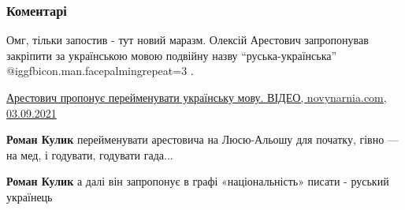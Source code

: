  
 
 
 
 
\subsubsection{Коментарі}
\label{sec:03_09_2021.fb.kulyk_roman.1.ukraina_rusj_bezumstvo.cmt}

\begin{itemize}

Омг, тільки запостив - тут новий маразм. Олексій Арестович запропонував
закріпити за українською мовою подвійну назву
\enquote{руська-українська} @igg{fbicon.man.facepalming}{repeat=3} .

\href{https://novynarnia.com/2021/09/03/arestovych-proponuye-perejmenuvaty-ukrayinsku-movu}{%
Арестович пропонує перейменувати українську мову. ВІДЕО, novynarnia.com, 03.09.2021%
}

\begin{itemize}
 
\textbf{Роман Кулик} перейменувати арестовича на Люсю-Альошу для початку, гівно — на мед, і годувати, годувати гада...

 
\textbf{Роман Кулик} а далі він запропонує в графі «національність» писати - руський українець 🤡

 

\end{itemize}
\end{itemize}
